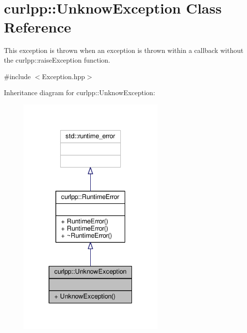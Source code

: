 \hypertarget{classcurlpp_1_1UnknowException}{\section{curlpp\-:\-:Unknow\-Exception Class Reference}
\label{classcurlpp_1_1UnknowException}
}


This exception is thrown when an exception is thrown within a callback without the curlpp\-::raise\-Exception function.  




{\ttfamily \#include $<$Exception.\-hpp$>$}



Inheritance diagram for curlpp\-:\-:Unknow\-Exception\-:
\nopagebreak
\begin{figure}[H]
\begin{center}
\leavevmode
\includegraphics[width=208pt]{classcurlpp_1_1UnknowException__inherit__graph}
\end{center}
\end{figure}


